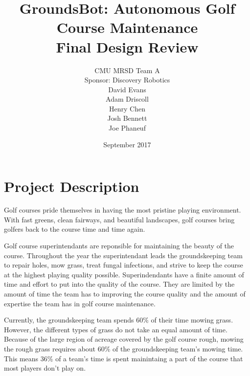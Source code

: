 \documentclass[12pt]{extarticle}
\begin{document}


\title{GroundsBot: Autonomous Golf Course Maintenance \\[.5ex]
		\Large Final Design Review}
\date{September 2017}
\author{CMU MRSD Team A        \\ Sponsor: Discovery Robotics \\ David Evans \\
        Adam Driscoll \\ Henry Chen  \\
        Josh Bennett  \\ Joe Phaneuf \\ }

\maketitle
\def\svgwidth{\columnwidth}

\newpage

\begin{spacing}{0.95}
\tableofcontents
\end{spacing}

\newpage

\newpage
\section{Project Description}

Golf courses pride themselves in having the most pristine playing environment.  With fast greens, clean fairways, and beautiful landscapes, golf courses bring golfers back to the course time and time again.  

Golf course superintendants are reponsible for maintaining the beauty of the course.  Throughout the year the superintendant leads the groundskeeping team to repair holes, mow grass, treat fungal infections, and strive to keep the course at the highest playing quality possible.  Superindendants have a finite amount of time and effort to put into the quality of the course.  They are limited by the amount of time the team has to improving the course quality and the amount of expertise the team has in golf course maintenance.

Currently, the groundskeeping team spends 60\% of their time mowing grass.  However, the different types of grass do not take an equal amount of time.  Because of the large region of acreage covered by the golf course rough, mowing the rough grass requires about 60\% of the groundskeeping team's mowing time.  This means 36\% of a team's time is spent mainintaing a part of the course that most players don't play on.  
\end{document}
